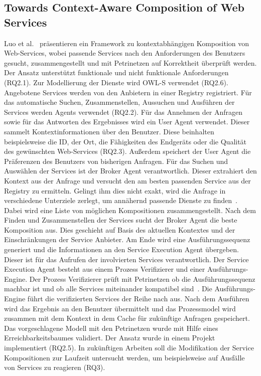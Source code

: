\documentclass[conference,compsoc,ngerman]{IEEEtran}
\begin{document}
\subsection{Towards Context-Aware Composition of Web Services}
Luo et al.~\cite{luo2006towards} präsentieren ein Framework zu kontextabhängigen Komposition von Web-Services, wobei passende Services nach den Anforderungen des Benutzers gesucht, zusammengestellt und mit Petrinetzen auf Korrektheit überprüft werden. Der Ansatz unterstützt funktionale und nicht funktionale Anforderungen (RQ2.1). Zur Modellierung der Dienste wird OWL-S verwendet (RQ2.6). Angebotene Services werden von den Anbietern in einer Registry registriert. Für das automatische Suchen, Zusammenstellen, Aussuchen und Ausführen der Services werden Agents verwendet (RQ2.2).
Für das Annehmen der Anfragen sowie für das Antworten des Ergebnisses wird ein User Agent verwendet. Dieser sammelt Kontextinformationen über den Benutzer. Diese beinhalten beispielsweise die ID, der Ort, die Fähigkeiten des Endgeräts oder die Qualität des gewünschten Web-Services (RQ2.3). Außerdem speichert der User Agent die Präferenzen des Benutzers von bisherigen Anfragen.
Für das Suchen und Auswählen der Services ist der Broker Agent verantwortlich. Dieser extrahiert den Kontext aus der Anfrage und versucht den am besten passenden Service aus der Registry zu ermitteln. Gelingt ihm dies nicht exakt, wird die Anfrage in verschiedene Unterziele zerlegt, um annähernd passende Dienste zu finden~\cite{luo2006towards}. Dabei wird eine Liste von möglichen Kompositionen zusammengestellt. Nach dem Finden und Zusammenstellen der Services sucht der Broker Agent die beste Komposition aus. Dies geschieht auf Basis des aktuellen Kontextes und der Einschränkungen der Service Anbieter. Am Ende wird eine Ausführungssequenz generiert und die Informationen an den Service Execution Agent übergeben. Dieser ist für das Aufrufen der involvierten Services verantwortlich. Der Service Execution Agent besteht aus einem Prozess Verifizierer und einer Ausführungs-Engine. Der Prozess Verifizierer prüft mit Petrinetzen ob die Ausführungssequenz machbar ist und ob alle Services miteinander kompatibel sind~\cite{luo2006towards}. Die Ausführungs-Engine führt die verifizierten Services der Reihe nach aus. Nach dem Ausführen wird das Ergebnis an den Benutzer übermittelt und das Prozessmodel wird zusammen mit dem Kontext in dem Cache für zukünftige Anfragen gespeichert.
Das vorgeschlagene Modell mit den Petrinetzen wurde mit Hilfe eines Erreichbarkeitsbaumes validiert. Der Ansatz wurde in einem Projekt implementiert (RQ2.5). In zukünftigen Arbeiten soll die Modifikation der Service Kompositionen zur Laufzeit untersucht werden, um beispielsweise auf Ausfälle von Services zu reagieren (RQ3).
\end{document}
